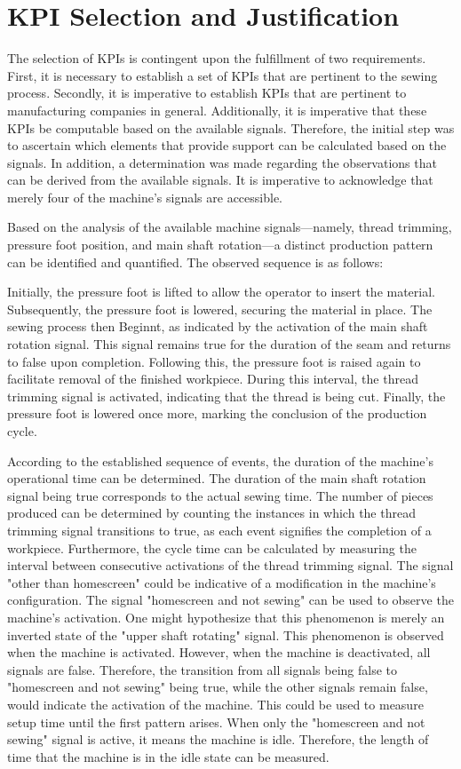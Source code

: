 {\section{KPI Selection and Justification}
The selection of KPIs is contingent upon the fulfillment of two requirements. First, it is necessary to establish a set of KPIs that are pertinent to the sewing process. Secondly, it is imperative to establish KPIs that are pertinent to manufacturing companies in general. Additionally, it is imperative that these KPIs be computable based on the available signals. Therefore, the initial step was to ascertain which elements that provide support can be calculated based on the signals. In addition, a determination was made regarding the observations that can be derived from the available signals. It is imperative to acknowledge that merely four of the machine's signals are accessible.

Based on the analysis of the available machine signals—namely, thread trimming, pressure foot position, and main shaft rotation—a distinct production pattern can be identified and quantified. The observed sequence is as follows:

Initially, the pressure foot is lifted to allow the operator to insert the material. Subsequently, the pressure foot is lowered, securing the material in place. The sewing process then Beginnt, as indicated by the activation of the main shaft rotation signal. This signal remains true for the duration of the seam and returns to false upon completion. Following this, the pressure foot is raised again to facilitate removal of the finished workpiece. During this interval, the thread trimming signal is activated, indicating that the thread is being cut. Finally, the pressure foot is lowered once more, marking the conclusion of the production cycle.

According to the established sequence of events, the duration of the machine's operational time can be determined. The duration of the main shaft rotation signal being true corresponds to the actual sewing time. The number of pieces produced can be determined by counting the instances in which the thread trimming signal transitions to true, as each event signifies the completion of a workpiece. Furthermore, the cycle time can be calculated by measuring the interval between consecutive activations of the thread trimming signal.
The signal "other than homescreen" could be indicative of a modification in the machine's configuration.
The signal "homescreen and not sewing" can be used to observe the machine's activation. One might hypothesize that this phenomenon is merely an inverted state of the "upper shaft rotating" signal. This phenomenon is observed when the machine is activated. However, when the machine is deactivated, all signals are false. Therefore, the transition from all signals being false to "homescreen and not sewing" being true, while the other signals remain false, would indicate the activation of the machine. This could be used to measure setup time until the first pattern arises.
When only the "homescreen and not sewing" signal is active, it means the machine is idle. Therefore, the length of time that the machine is in the idle state can be measured.

}

